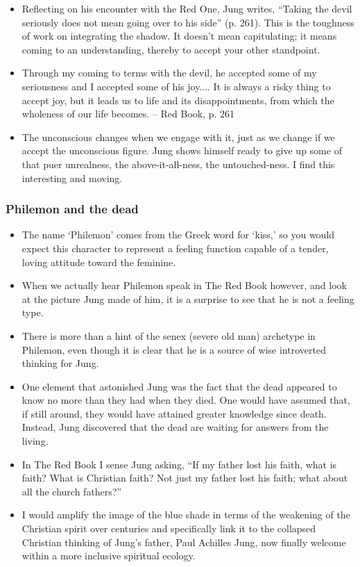 \begin{itemize}
\item Reflecting on his encounter with the Red One, Jung writes, ``Taking the
devil seriously does not mean going over to his side'' (p. 261). This is the
toughness of work on integrating the shadow. It doesn't mean capitulating; it
means coming to an understanding, thereby to accept your other standpoint.

\item Through my coming to terms with the devil, he accepted some of my
seriousness and I accepted some of his joy.... It is always a risky thing to
accept joy, but it leads us to life and its disappointments, from which the
wholeness of our life becomes. -- Red Book, p. 261

\item The unconscious changes when we engage with it, just as we change if we
accept the unconscious figure. Jung shows himself ready to give up some of that
puer unrealness, the above-it-all-ness, the untouched-ness. I find this
interesting and moving.

\end{itemize}

\subsubsection{Philemon and the dead}

\begin{itemize}

\item The name `Philemon' comes from the Greek word for `kiss,' so you would
expect this character to represent a feeling function capable of a tender,
loving attitude toward the feminine.

\item When we actually hear Philemon speak in The Red Book however, and look at
the picture Jung made of him, it is a surprise to see that he is not a feeling
type.

\item There is more than a hint of the senex (severe old man) archetype in
Philemon, even though it is clear that he is a source of wise introverted
thinking for Jung.

\item One element that astonished Jung was the fact that the dead appeared to
know no more than they had when they died. One would have assumed that, if
still around, they would have attained greater knowledge since death.  Instead,
Jung discovered that the dead are waiting for answers from the living.

\item In The Red Book I sense Jung asking, ``If my father lost his faith, what
is faith? What is Christian faith? Not just my father lost his faith; what
about all the church fathers?''

\item I would amplify the image of the blue shade in terms of the weakening of
the Christian spirit over centuries and specifically link it to the collapsed
Christian thinking of Jung's father, Paul Achilles Jung, now finally welcome
within a more inclusive spiritual ecology.

\end{itemize}

